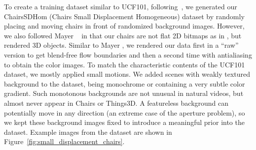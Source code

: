 \documentclass[10pt,twocolumn,letterpaper]{article}%
\newcommand{\chairs}{\mbox{Chairs}\xspace}
\newcommand{\things}{\mbox{Things3D}\xspace}
\begin{document}
To create a training dataset similar to UCF101, following~\cite{DFIB15}, we generated our ChairsSDHom (Chairs Small Displacement Homogeneous)  dataset by randomly placing and moving chairs in front of randomized background images. However, we also followed Mayer \etal~\cite{MIFDB16} in that our chairs are not flat 2D bitmaps as in \cite{DFIB15}, but rendered 3D objects.
Similar to Mayer \etal, we rendered our data first in a ``raw'' version to get blend-free flow boundaries and then a second time with antialiasing to obtain the color images. 
To match the characteristic contents of the UCF101 dataset, we mostly applied small motions.
We added scenes with weakly textured background to the dataset, being monochrome or containing a very subtle color gradient.
Such monotonous backgrounds are not unusual in natural videos, but almost never appear in \chairs or \things.
A featureless background can potentially move in any direction (an extreme case of the aperture problem), so we kept these background images fixed to introduce a meaningful prior into the dataset.
Example images from the dataset are shown in Figure~\ref{fig:small_displacement_chairs}. 

\end{document}
